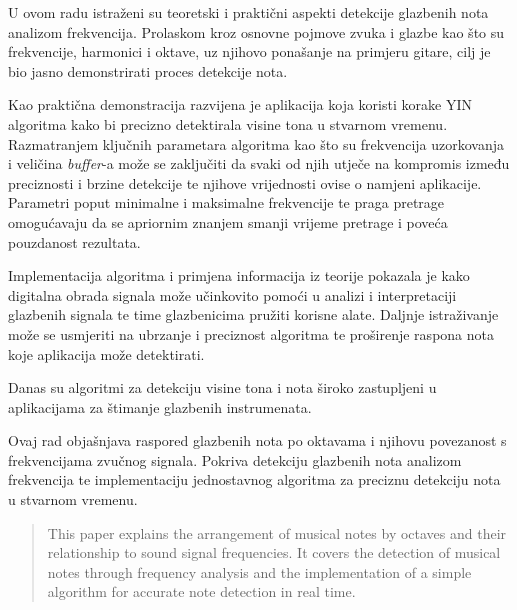 \documentclass[times, utf8, diplomski, numeric]{fer}
\begin{document}
U ovom radu istraženi su teoretski i praktični aspekti detekcije glazbenih nota analizom frekvencija. Prolaskom kroz osnovne pojmove zvuka i glazbe kao što su frekvencije, harmonici i oktave, uz njihovo ponašanje na primjeru gitare, cilj je bio jasno demonstrirati proces detekcije nota.

Kao praktična demonstracija razvijena je aplikacija koja koristi korake YIN algoritma kako bi precizno detektirala visine tona u stvarnom vremenu. Razmatranjem ključnih parametara algoritma kao što su frekvencija uzorkovanja i veličina \textit{buffer}-a može se zaključiti da svaki od njih utječe na kompromis između preciznosti i brzine detekcije te njihove vrijednosti ovise o namjeni aplikacije. Parametri poput minimalne i maksimalne frekvencije te praga pretrage omogućavaju da se apriornim znanjem smanji vrijeme pretrage i poveća pouzdanost rezultata.

Implementacija algoritma i primjena informacija iz teorije pokazala je kako digitalna obrada signala može učinkovito pomoći u analizi i interpretaciji glazbenih signala te time glazbenicima pružiti korisne alate. Daljnje istraživanje može se usmjeriti na ubrzanje i preciznost algoritma te proširenje raspona nota koje aplikacija može detektirati. 

Danas su algoritmi za detekciju visine tona i nota široko zastupljeni u aplikacijama za štimanje glazbenih instrumenata.




\begin{sazetak}
Ovaj rad objašnjava raspored glazbenih nota po oktavama i njihovu povezanost s frekvencijama zvučnog signala. Pokriva detekciju glazbenih nota analizom frekvencija te implementaciju jednostavnog algoritma za preciznu detekciju nota u stvarnom vremenu.

\end{sazetak}

\begin{abstract}
This paper explains the arrangement of musical notes by octaves and their relationship to sound signal frequencies. It covers the detection of musical notes through frequency analysis and the implementation of a simple algorithm for accurate note detection in real time.

\end{abstract}
\end{document}
